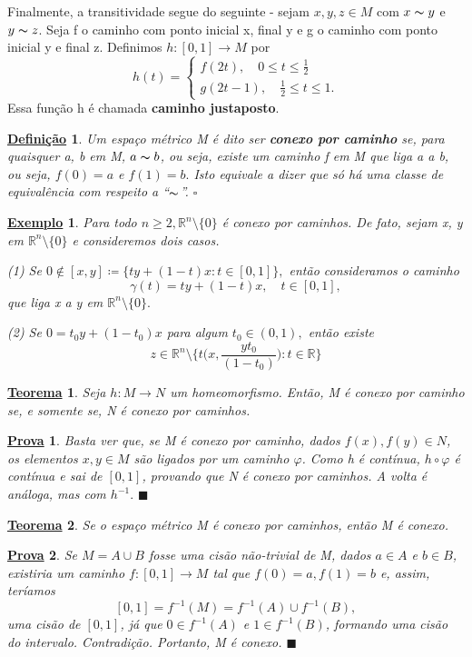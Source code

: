 \documentclass{article}
\newtheorem*{def*}{\underline{Defini\c c\~ao}}
\newtheorem*{theorem*}{\underline{Teorema}}
\newtheorem{example}{\underline{Exemplo}}
\newtheorem*{proof*}{\underline{Prova}}
\renewcommand\qedsymbol{$\blacksquare$}
\begin{document}
Finalmente, a transitividade segue do seguinte - sejam \(x, y, z\in M\) com \(x\thicksim y\) e \(y\thicksim z\). Seja f o caminho com ponto inicial x, final y e g o 
caminho com ponto inicial y e final z. Definimos \(h:[0, 1]\rightarrow M \) por 
  \[
    h(t) = \left\{\begin{array}{ll}
        f(2t),\quad 0\leq t\leq \frac{1}{2}\\
        g(2t-1),\quad \frac{1}{2}\leq t\leq 1.
      \end{array}\right.
  \]
  Essa função h é chamada \textbf{caminho justaposto}.
 \begin{def*}
   Um espaço métrico M é dito ser \textbf{conexo por caminho} se, para quaisquer a, b em M, \(a\thicksim b\), ou seja,
existe um caminho f em M que liga a a b, ou seja, \(f(0)=a\) e \(f(1)=b.\) Isto equivale a dizer que só há uma 
classe de equivalência com respeito a ``\(\thicksim\)''. \(\square\)
 \end{def*}
 \begin{example}
   Para todo \(n\geq 2, \mathbb{R}^{n}\setminus\{0\}\) é conexo por caminhos. De fato, sejam x, y em \(\mathbb{R}^{n}\setminus\{0\}\) e
consideremos dois casos.

  (1) Se \(0\not\in[x, y]\coloneqq \{ty + (1-t)x: t\in[0, 1]\},\) então consideramos o caminho 
    \[
      \gamma (t) = ty + (1-t)x,\quad t\in[0,1],
    \]
  que liga x a y em \(\mathbb{R}^{n}\setminus\{0\}.\)

  (2) Se \(0 = t_{0}y + (1-t_{0})x\) para algum \(t_{0}\in (0, 1),\) então existe 
    \[
      z\in \mathbb{R}^{n}\setminus\biggl\{t \biggl(x, \frac{yt_{0}}{(1-t_{0})}\biggr):t\in \mathbb{R}\biggr\}
    \] 
 \end{example}
 \begin{theorem*}
   Seja \(h:M\rightarrow N\) um homeomorfismo. Então, M é conexo por caminho se, e somente se, N é conexo por caminhos.
 \end{theorem*}
 \begin{proof*}
   Basta ver que, se M é conexo por caminho, dados \(f(x), f(y)\in N\), os elementos \(x, y\in M\) são ligados por um caminho \(\varphi \). Como h
é contínua, \(h\circ{\varphi }\) é contínua e sai de \([0, 1]\), provando que N é conexo por caminhos. A volta é análoga, mas com \(h^{-1}.\) \qedsymbol
 \end{proof*}
 \begin{theorem*}
   Se o espaço métrico M é conexo por caminhos, então M é conexo.
 \end{theorem*}
 \begin{proof*}
   Se \(M = A \cup B\) fosse uma cisão não-trivial de M, dados \(a\in A\) e \(b\in B\), existiria um caminho 
  \(f:[0, 1]\rightarrow M\) tal que \(f(0) = a, f(1) = b\) e, assim, teríamos 
    \[
      [0, 1] = f^{-1}(M) = f^{-1}(A)\cup f^{-1}(B),
    \]
    uma cisão de \([0, 1]\), já que \(0\in f^{-1}(A)\) e \(1\in f^{-1}(B)\), formando uma cisão do intervalo. Contradição.
Portanto, M é conexo. \qedsymbol
 \end{proof*}
\end{document}
